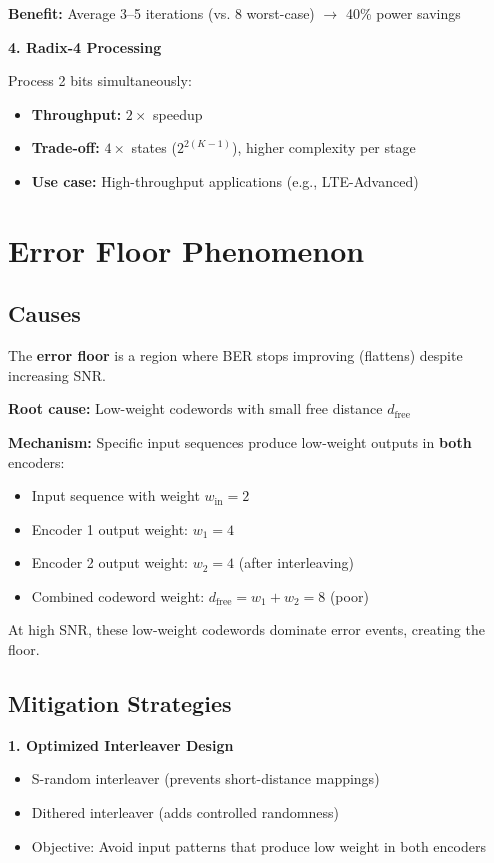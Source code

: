 \textbf{Benefit:} Average 3--5 iterations (vs. 8 worst-case) $\rightarrow$ 40\% power savings

\textbf{4. Radix-4 Processing}

Process 2 bits simultaneously:
\begin{itemize}
\item \textbf{Throughput:} $2\times$ speedup
\item \textbf{Trade-off:} $4\times$ states ($2^{2(K-1)}$), higher complexity per stage
\item \textbf{Use case:} High-throughput applications (e.g., LTE-Advanced)
\end{itemize}

\section{Error Floor Phenomenon}

\subsection{Causes}

The \textbf{error floor} is a region where BER stops improving (flattens) despite increasing SNR.

\textbf{Root cause:} Low-weight codewords with small free distance $d_{\text{free}}$

\textbf{Mechanism:} Specific input sequences produce low-weight outputs in \textbf{both} encoders:
\begin{itemize}
\item Input sequence with weight $w_{\text{in}} = 2$
\item Encoder 1 output weight: $w_1 = 4$
\item Encoder 2 output weight: $w_2 = 4$ (after interleaving)
\item Combined codeword weight: $d_{\text{free}} = w_1 + w_2 = 8$ (poor)
\end{itemize}

At high SNR, these low-weight codewords dominate error events, creating the floor.

\subsection{Mitigation Strategies}

\textbf{1. Optimized Interleaver Design}
\begin{itemize}
\item S-random interleaver (prevents short-distance mappings)
\item Dithered interleaver (adds controlled randomness)
\item Objective: Avoid input patterns that produce low weight in both encoders
\end{itemize}

